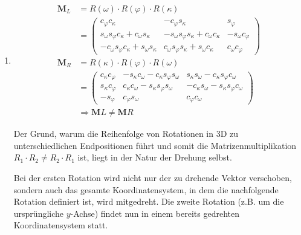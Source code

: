 \documentclass[11pt]{article}
\begin{document}
\begin{enumerate}
  \item
        \begin{align*}
          \mathbf{M}_{L} & = R(\omega) \cdot R(\varphi) \cdot R(\kappa) \\
                         & =                                            %
          \begin{pmatrix}
            c_\varphi c_\kappa                               & -c_\varphi s_\kappa                              & s_\varphi           \\
            s_\omega s_\varphi c_\kappa + c_\omega s_\kappa  & -s_\omega s_\varphi s_\kappa + c_\omega c_\kappa & -s_\omega c_\varphi \\
            -c_\omega s_\varphi c_\kappa + s_\omega s_\kappa & c_\omega s_\varphi s_\kappa + s_\omega c_\kappa  & c_\omega c_\varphi
          \end{pmatrix}%
          \\
          \mathbf{M}_{R} & = R(\kappa) \cdot R(\varphi) \cdot R(\omega) \\
                         & =                                            %
          \begin{pmatrix}
            c_\kappa c_\varphi & -s_\kappa c_\omega - c_\kappa s_\varphi s_\omega & s_\kappa s_\omega - c_\kappa s_\varphi c_\omega  \\
            s_\kappa c_\varphi & c_\kappa c_\omega - s_\kappa s_\varphi s_\omega  & -c_\kappa s_\omega - s_\kappa s_\varphi c_\omega \\
            -s_\varphi         & c_\varphi s_\omega                               & c_\varphi c_\omega
          \end{pmatrix}%
          \\
                         & \Rightarrow \mathbf{M}{L} \neq \mathbf{M}{R}
        \end{align*}

        Der Grund, warum die Reihenfolge von Rotationen in 3D zu unterschiedlichen Endpositionen führt und somit die Matrizenmultiplikation $R_1 \cdot R_2 \neq R_2 \cdot R_1$ ist, liegt in der Natur der Drehung selbst.

        Bei der ersten Rotation wird nicht nur der zu drehende Vektor verschoben, sondern auch das gesamte Koordinatensystem, in dem die nachfolgende Rotation definiert ist, wird mitgedreht. Die zweite Rotation (z.B. um die ursprüngliche $y$-Achse) findet nun in einem bereits gedrehten Koordinatensystem statt.
\end{enumerate}
\end{document}
